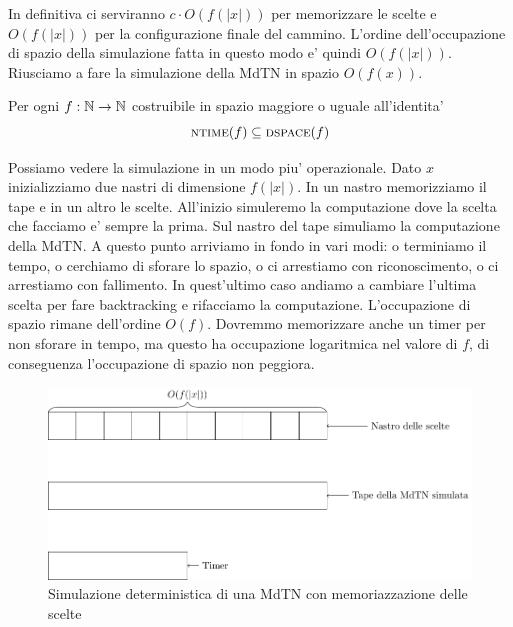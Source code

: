 In definitiva ci serviranno $c\cdot O(f(|x|))$ per memorizzare le scelte e $O(f(|x|))$ per la
configurazione finale del cammino. L'ordine dell'occupazione di spazio della simulazione fatta in
questo modo e' quindi $O(f(|x|))$. Riusciamo a fare la simulazione della MdTN in spazio $O(f(x))$.

\begin{thm}\label{thm:ntimedspace}
    Per ogni $f:\mathbb{N} \to \mathbb{N}$ costruibile in spazio maggiore o uguale all'identita'
    \begin{equation*}
        \textsc{ntime}(f) \subseteq \textsc{dspace}(f)
    \end{equation*}
\end{thm}

Possiamo vedere la simulazione in un modo piu' operazionale. Dato $x$ inizializziamo due nastri di
dimensione $f(|x|)$. In un nastro memorizziamo il tape e in un altro le scelte. All'inizio
simuleremo la computazione dove la scelta che facciamo e' sempre la prima. Sul nastro del tape
simuliamo la computazione della MdTN. A questo punto arriviamo in fondo in vari modi: o terminiamo
il tempo, o cerchiamo di sforare lo spazio, o ci arrestiamo con riconoscimento, o ci arrestiamo con
fallimento. In quest'ultimo caso andiamo a cambiare l'ultima scelta per fare backtracking e
rifacciamo la computazione. L'occupazione di spazio rimane dell'ordine $O(f)$. Dovremmo memorizzare
anche un timer per non sforare in tempo, ma questo ha occupazione logaritmica nel valore di $f$, di
conseguenza l'occupazione di spazio non peggiora.

\begin{figure}[h]
    \begin{center}
        \includegraphics[scale=0.7]{./img/nondeterminism/Simulation.pdf}
        \caption{Simulazione deterministica di una MdTN con memoriazzazione delle scelte}
    \end{center}
\end{figure}

